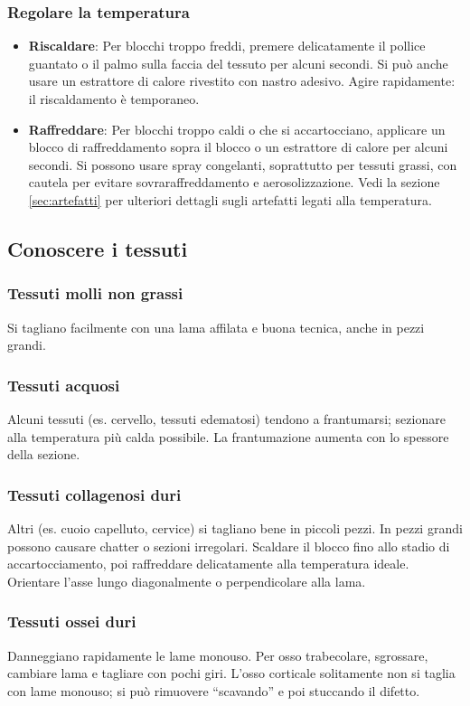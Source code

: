 \subsubsection{Regolare la temperatura}
\begin{itemize}
\item \textbf{Riscaldare}: Per blocchi troppo freddi, premere delicatamente il pollice guantato o il palmo sulla faccia del tessuto per alcuni secondi. Si può anche usare un estrattore di calore rivestito con nastro adesivo. Agire rapidamente: il riscaldamento è temporaneo.
\item \textbf{Raffreddare}: Per blocchi troppo caldi o che si accartocciano, applicare un blocco di raffreddamento sopra il blocco o un estrattore di calore per alcuni secondi. Si possono usare spray congelanti, soprattutto per tessuti grassi, con cautela per evitare sovraraffreddamento e aerosolizzazione.
Vedi la sezione \ref{sec:artefatti} per ulteriori dettagli sugli artefatti legati alla temperatura.
\end{itemize}

\subsection{Conoscere i tessuti}
\subsubsection{Tessuti molli non grassi} 
Si tagliano facilmente con una lama affilata e buona tecnica, anche in pezzi grandi.
\subsubsection{Tessuti acquosi} 
Alcuni tessuti (es. cervello, tessuti edematosi) tendono a frantumarsi; sezionare alla temperatura più calda possibile. La frantumazione aumenta con lo spessore della sezione.
\subsubsection{Tessuti collagenosi duri}
Altri (es. cuoio capelluto, cervice) si tagliano bene in piccoli pezzi. In pezzi grandi possono causare chatter o sezioni irregolari. Scaldare il blocco fino allo stadio di accartocciamento, poi raffreddare delicatamente alla temperatura ideale. Orientare l'asse lungo diagonalmente o perpendicolare alla lama.
\subsubsection{Tessuti ossei duri} 
Danneggiano rapidamente le lame monouso. Per osso trabecolare, sgrossare, cambiare lama e tagliare con pochi giri. L'osso corticale solitamente non si taglia con lame monouso; si può rimuovere ``scavando'' e poi stuccando il difetto.
